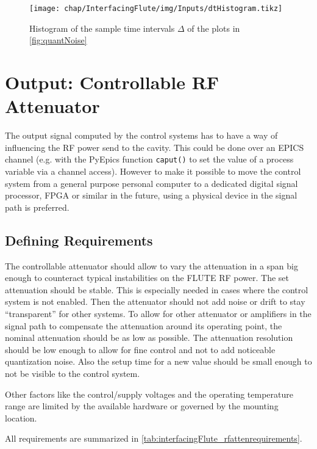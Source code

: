 \begin{figure}[tb]
\centering
\texttt{[image: chap/InterfacingFlute/img/Inputs/dtHistogram.tikz]}
\caption{Histogram of the sample time intervals $\Delta$ of the plots in \autoref{fig:quantNoise}}
\label{fig:interfacingFlute_sampleTimesHist}
\end{figure}






\section{Output: Controllable RF Attenuator}
The output signal computed by the control systems has to have a way of influencing the RF power send to the cavity. This could be done over an EPICS channel (e.g. with the PyEpics function \texttt{caput()} to set the value of a process variable via a channel access). However to make it possible to move the control system from a general purpose personal computer to a dedicated digital signal processor, FPGA or similar in the future, using a physical device in the signal path is preferred.\\

\subsection{Defining Requirements}
The controllable attenuator should allow to vary the attenuation in a span big enough to counteract typical instabilities on the FLUTE RF power. The set attenuation should be stable. This is especially needed in cases where the control system is not enabled. Then the attenuator should not add noise or drift to stay ``transparent'' for other systems. To allow for other attenuator or amplifiers in the signal path to compensate the attenuation around its operating point, the nominal attenuation should be as low as possible. The attenuation resolution should be low enough to allow for fine control and not to add noticeable quantization noise. Also the setup time for a new value should be small enough to not be visible to the control system.

Other factors like the control/supply voltages and the operating temperature range are limited by the available hardware or governed by the mounting location.

All requirements are summarized in \autoref{tab:interfacingFlute_rfattenrequirements}.

